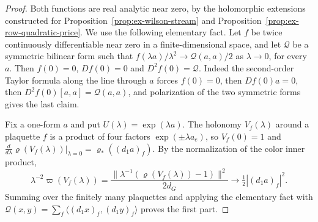 \begin{proof}
Both functions are real analytic near zero, by the holomorphic
extensions constructed for Proposition~\ref{prop:ex-wilson-stream} and
Proposition~\ref{prop:ex-row-quadratic-price}. We use the following
elementary fact. Let $f$ be twice continuously differentiable near
zero in a finite-dimensional space, and let $\mathcal Q$ be a symmetric
bilinear form such that $f(\lambda a)/\lambda^2\to\mathcal Q(a,a)/2$
as $\lambda\to0$, for every $a$. Then $f(0)=0$, $Df(0)=0$ and
$D^2f(0)=\mathcal Q$. Indeed the second-order Taylor formula along the
line through $a$ forces $f(0)=0$, then $Df(0)a=0$, then
$D^2f(0)[a,a]=\mathcal Q(a,a)$, and polarization of the two symmetric
forms gives the last claim.

Fix a one-form $a$ and put $U(\lambda)=\exp(\lambda a)$. The holonomy
$V_f(\lambda)$ around a plaquette $f$ is a product of four factors
$\exp(\pm\lambda a_e)$, so $V_f(0)=1$ and
$\frac{d}{d\lambda}\varrho(V_f(\lambda))|_{\lambda=0}
=\varrho_*((d_1a)_f)$. By the normalization of the color inner product,
\[
 \lambda^{-2}\varpi(V_f(\lambda))
   =\frac{\|\lambda^{-1}(\varrho(V_f(\lambda))-1)\|^2}{2d_G}
   \longrightarrow\tfrac12|(d_1a)_f|^2 .
\]
Summing over the finitely many plaquettes and applying the elementary
fact with $\mathcal Q(x,y)=\sum_f\langle(d_1x)_f,(d_1y)_f\rangle$
proves the first part.


\end{proof}
